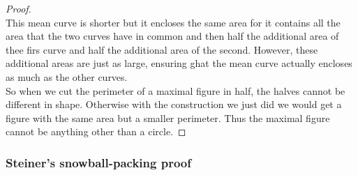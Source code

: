 \documentclass[12pt, a4paper, titlepage]{article}
\begin{document}
\begin{proof}
\\
This mean curve is shorter but it encloses the same area for it contains all the area that the two curves have in common and then half the additional area of thee firs curve and half the additional area of the second. However, these additional areas are just as large, ensuring ghat the mean curve actually encloses as much as the other curves.\\
So when we cut the perimeter of a maximal figure in half, the halves cannot be different in shape. Otherwise with the construction we just did we would get a figure with the same area but a smaller perimeter. Thus the maximal figure cannot be anything other than a circle.
\end{proof}

\subsubsection*{Steiner's snowball-packing proof}
\end{document}
